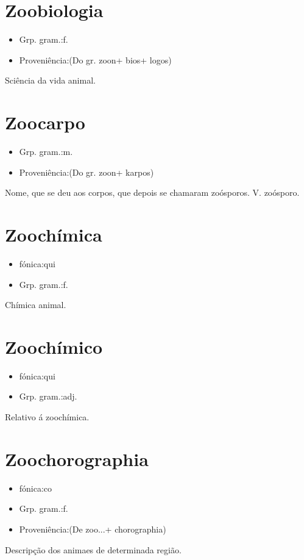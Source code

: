 \section{Zoobiologia}
\begin{itemize}
\item {Grp. gram.:f.}
\end{itemize}
\begin{itemize}
\item {Proveniência:(Do gr. \textunderscore zoon\textunderscore  + \textunderscore bios\textunderscore  + \textunderscore logos\textunderscore )}
\end{itemize}
Sciência da vida animal.
\section{Zoocarpo}
\begin{itemize}
\item {Grp. gram.:m.}
\end{itemize}
\begin{itemize}
\item {Proveniência:(Do gr. \textunderscore zoon\textunderscore  + \textunderscore karpos\textunderscore )}
\end{itemize}
Nome, que se deu aos corpos, que depois se chamaram zoósporos.
V. \textunderscore zoósporo\textunderscore .
\section{Zoochímica}
\begin{itemize}
\item {fónica:qui}
\end{itemize}
\begin{itemize}
\item {Grp. gram.:f.}
\end{itemize}
Chímica animal.
\section{Zoochímico}
\begin{itemize}
\item {fónica:qui}
\end{itemize}
\begin{itemize}
\item {Grp. gram.:adj.}
\end{itemize}
Relativo á zoochímica.
\section{Zoochorographia}
\begin{itemize}
\item {fónica:co}
\end{itemize}
\begin{itemize}
\item {Grp. gram.:f.}
\end{itemize}
\begin{itemize}
\item {Proveniência:(De \textunderscore zoo...\textunderscore  + \textunderscore chorographia\textunderscore )}
\end{itemize}
Descripção dos animaes de determinada região.

